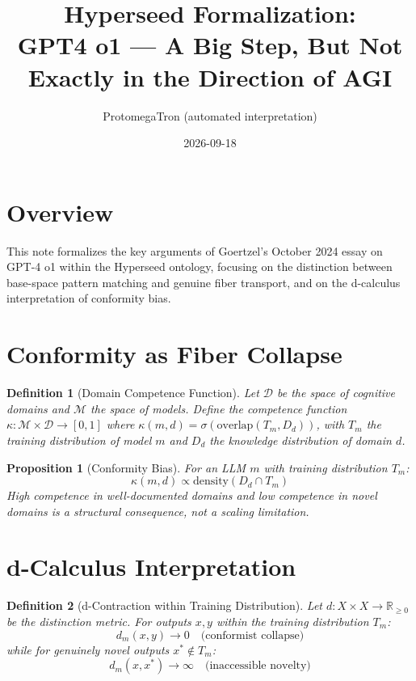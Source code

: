 \documentclass[11pt]{article}
\title{Hyperseed Formalization:\\GPT4 o1 --- A Big Step, But Not Exactly in the Direction of AGI}
\author{ProtomegaTron (automated interpretation)}
\date{2026-09-18}
\newtheorem{definition}{Definition}
\newtheorem{proposition}{Proposition}
\begin{document}
\maketitle

\section{Overview}

This note formalizes the key arguments of Goertzel's October 2024 essay
on GPT-4 o1 within the Hyperseed ontology, focusing on the distinction
between base-space pattern matching and genuine fiber transport, and on
the d-calculus interpretation of conformity bias.

\section{Conformity as Fiber Collapse}

\begin{definition}[Domain Competence Function]
Let $\mathcal{D}$ be the space of cognitive domains and $\mathcal{M}$
the space of models. Define the competence function
$\kappa: \mathcal{M} \times \mathcal{D} \to [0,1]$ where
$\kappa(m, d) = \sigma(\text{overlap}(T_m, D_d))$, with $T_m$ the
training distribution of model $m$ and $D_d$ the knowledge distribution
of domain $d$.
\end{definition}

\begin{proposition}[Conformity Bias]
For an LLM $m$ with training distribution $T_m$:
\[
  \kappa(m, d) \propto \text{density}(D_d \cap T_m)
\]
High competence in well-documented domains and low competence in novel
domains is a structural consequence, not a scaling limitation.
\end{proposition}

\section{d-Calculus Interpretation}

\begin{definition}[d-Contraction within Training Distribution]
Let $d: X \times X \to \mathbb{R}_{\geq 0}$ be the distinction metric.
For outputs $x, y$ within the training distribution $T_m$:
\[
  d_m(x, y) \to 0 \quad \text{(conformist collapse)}
\]
while for genuinely novel outputs $x^* \notin T_m$:
\[
  d_m(x, x^*) \to \infty \quad \text{(inaccessible novelty)}
\]
\end{definition}
\end{document}
